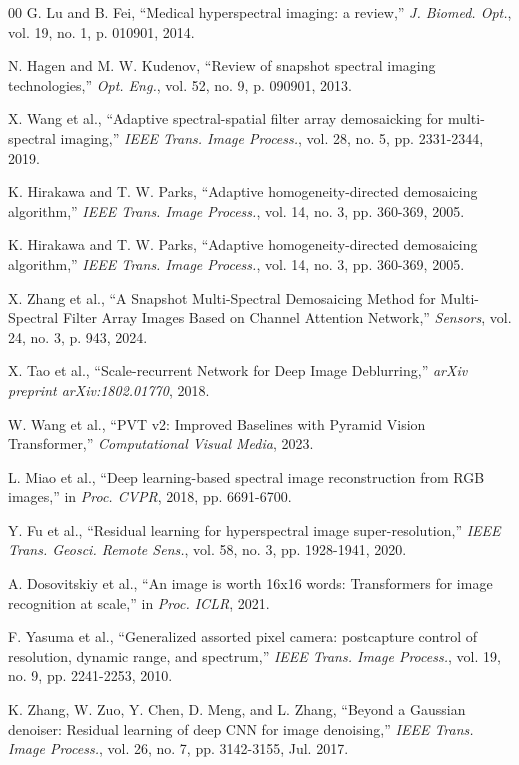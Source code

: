\documentclass[conference]{IEEEtran}
\begin{document}
\begin{thebibliography}{00}
 G. Lu and B. Fei, ``Medical hyperspectral imaging: a review,'' \emph{J. Biomed. Opt.}, vol. 19, no. 1, p. 010901, 2014.

 N. Hagen and M. W. Kudenov, ``Review of snapshot spectral imaging technologies,'' \emph{Opt. Eng.}, vol. 52, no. 9, p. 090901, 2013.

 X. Wang et al., ``Adaptive spectral-spatial filter array demosaicking for multi-spectral imaging,'' \emph{IEEE Trans. Image Process.}, vol. 28, no. 5, pp. 2331-2344, 2019.

 K. Hirakawa and T. W. Parks, ``Adaptive homogeneity-directed demosaicing algorithm,'' \emph{IEEE Trans. Image Process.}, vol. 14, no. 3, pp. 360-369, 2005.

 K. Hirakawa and T. W. Parks, ``Adaptive homogeneity-directed demosaicing algorithm,'' \emph{IEEE Trans. Image Process.}, vol. 14, no. 3, pp. 360-369, 2005.

 X. Zhang et al., ``A Snapshot Multi-Spectral Demosaicing Method for Multi-Spectral Filter Array Images Based on Channel Attention Network,'' \emph{Sensors}, vol. 24, no. 3, p. 943, 2024.

 X. Tao et al., ``Scale-recurrent Network for Deep Image Deblurring,'' \emph{arXiv preprint arXiv:1802.01770}, 2018.

 W. Wang et al., ``PVT v2: Improved Baselines with Pyramid Vision Transformer,'' \emph{Computational Visual Media}, 2023.

 L. Miao et al., ``Deep learning-based spectral image reconstruction from RGB images,'' in \emph{Proc. CVPR}, 2018, pp. 6691-6700.

 Y. Fu et al., ``Residual learning for hyperspectral image super-resolution,'' \emph{IEEE Trans. Geosci. Remote Sens.}, vol. 58, no. 3, pp. 1928-1941, 2020.

 A. Dosovitskiy et al., ``An image is worth 16x16 words: Transformers for image recognition at scale,'' in \emph{Proc. ICLR}, 2021.

 F. Yasuma et al., ``Generalized assorted pixel camera: postcapture control of resolution, dynamic range, and spectrum,'' \emph{IEEE Trans. Image Process.}, vol. 19, no. 9, pp. 2241-2253, 2010.

 K. Zhang, W. Zuo, Y. Chen, D. Meng, and L. Zhang, ``Beyond a Gaussian denoiser: Residual learning of deep CNN for image denoising,'' \emph{IEEE Trans. Image Process.}, vol. 26, no. 7, pp. 3142-3155, Jul. 2017.


\end{thebibliography}
\end{document}

